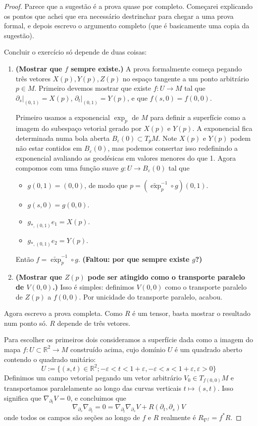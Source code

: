 \begin{proof}\leavevmode
Parece que a sugestão é a prova quase por completo. Começarei explicando os pontos que achei que era necessário destrinchar para chegar a uma prova formal, e depois escrevo o argumento completo (que é basicamente uma copia da sugestão).

Concluir o exercício só depende de duas coisas:
\begin{enumerate}
	\item \textbf{(Mostrar que \(f\) sempre existe.)} A prova formalmente começa pegando três vetores \(X(p),Y(p),Z(p)\) no espaço tangente a um ponto arbitrário \(p \in M\). Primeiro devemos mostrar que existe \(f:U \to M\) tal que \(\partial_s|_{(0,1)} = X(p)\), \(\partial_t|_{(0,1)}=Y(p)\), e que \(f(s,0)=f(0,0)\).

	Primeiro usamos a exponencial \(\operatorname{exp}_p\) de \(M\) para definir a superfície como a imagem do subespaço vetorial gerado por \(X(p)\) e \(Y(p)\). A exponencial fica determinada numa bola aberta \(B_\varepsilon(0)\subset T_pM\). Note \(X(p)\) e \(Y(p)\) podem não estar contidos em \(B_\varepsilon(0)\), mas podemos consertar isso redefinindo a exponencial avaliando as geodésicas em valores menores do que 1. Agora compomos com uma função suave \(g:U \to B_{\varepsilon}(0)\) tal que
\begin{itemize}
\item \(g(0,1)=(0,0)\), de modo que  \(p=(\widetilde{\operatorname{exp}}_p^{-1} \circ g)(0,1)\).
\item \(g(s,0)=g(0,0)\).
\item \(g_{*,(0,1)}e_1=X(p)\).
\item \(g_{*,(0,1)}e_2=Y(p)\).
\end{itemize}
Então \(f=\widetilde{\operatorname{exp}}^{-1}_p\circ g\). \textbf{(Faltou: por que sempre existe \(g\)?)}

\item \textbf{(Mostrar que \(Z(p)\) pode ser atingido como o transporte paralelo de \(V(0,0)\).)} Isso é simples: definimos \(V(0,0)\) como o transporte paralelo de \(Z(p)\) a \(f(0,0)\). Por unicidade do transporte paralelo, acabou.
\end{enumerate}

Agora escrevo a prova completa. Como \(R\) é um tensor, basta mostrar o resultado num ponto só. \(R\) depende de três vetores. 

Para escolher os primeiros dois consideramos a superfície dada como a imagem do mapa \(f:U \subset \mathbb{R}^2 \to M\) construído acima, cujo domínio \(U\) é um quadrado aberto contendo o quadrado unitário:
\[U:=\{(s,t)\in \mathbb{R}^2;-\varepsilon<t<1+\varepsilon,-\varepsilon<s<1+\varepsilon,\varepsilon>0\}\]
Definimos um campo vetorial pegando um vetor arbitrário \(V_0 \in T_{f(0,0)}M\) e transportamos paralelamente ao longo das curvas verticais \(t \mapsto  (s,t)\). Isso significa que \(\nabla_{\partial_t}V=0\), e concluimos que
	\[\nabla_{\partial_s}\nabla_{\partial_t}=0=\nabla_{\partial_t}\nabla_{\partial_s}V+R(\partial_t,\partial_s)V\]
onde todos os campos são seções ao longo de \(f\) e \(R\) realmente é \(R_{\nabla^f}=f^*R\).


\end{proof}
